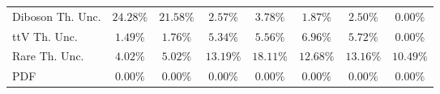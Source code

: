 \documentclass{outhesis}
\begin{document}
\begin{table}[htb!]
\begin{center}
{\begin{tabular}{|l|c|c|c|c|c|c|c|}
        \hline
        Diboson Th. Unc.    &    $24.28 \%$    &   $21.58 \%$    &    $2.57 \%$    &    $3.78 \%$    &    $1.87 \%$    &    $2.50 \%$       &    $0.00 \%$     \\
        ttV Th. Unc.    &    $1.49 \%$    &   $1.76 \%$    &    $5.34 \%$    &    $5.56 \%$    &    $6.96 \%$    &    $5.72 \%$       &    $0.00 \%$     \\
        Rare Th. Unc.    &    $4.02 \%$    &   $5.02 \%$    &    $13.19 \%$    &    $18.11 \%$    &    $12.68 \%$    &    $13.16 \%$       &    $10.49 \%$     \\
        PDF    &    $0.00 \%$    &   $0.00 \%$    &    $0.00 \%$    &    $0.00 \%$    &    $0.00 \%$    &    $0.00 \%$       &    $0.00 \%$     \\
\hline 
\end{tabular}}
\end{center}
\end{table}
\end{document}
